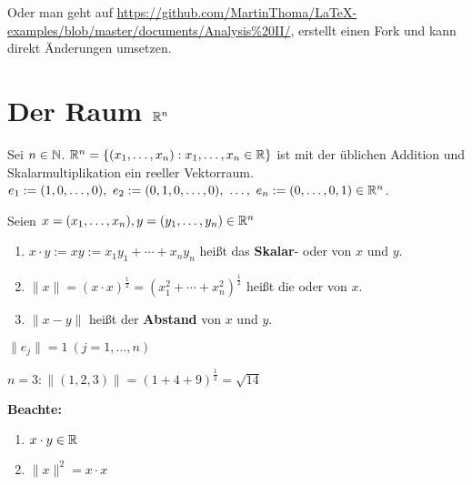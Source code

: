 \documentclass[a4paper,oneside,DIV15,BCOR12mm,chapterprefix=true,headings=onelinechapter]{scrbook}
\begin{document}
Oder man geht auf \url{https://github.com/MartinThoma/LaTeX-examples/blob/master/documents/Analysis%20II/},
erstellt einen Fork und kann direkt Änderungen umsetzen.


\renewcommand{\thechapter}{\arabic{chapter}}
\renewcommand{\chaptername}{§}
\setcounter{chapter}{0}

\chapter{Der Raum $\mathbb{R}^n$}

Sei $n\in\mathbb{N}$. $\mathbb{R}^n=\{(x_1, \ldots, x_n) : x_1,\ldots, x_n \in \mathbb{R}\}$ ist mit der üblichen Addition und Skalarmultiplikation ein reeller Vektorraum.\\
$e_1 := (1,0,\ldots,0),\ e_2:=(0,1,0,\ldots, 0),\ \ldots,\ e_n:=(0,\ldots,0,1) \in \mathbb{R}^n$.

\begin{definition}
Seien $x=(x_1, \ldots, x_n), y=(y_1, \ldots, y_n) \in \mathbb{R}^n$
\begin{enumerate}
\item $x\cdot y := xy := x_1y_1+\cdots+x_ny_n$ heißt das \textbf{Skalar}- oder  von $x$ und $y$.
\item $\|x\|=(x\cdot x)^\frac{1}{2} = (x_1^2 + \cdots + x_n^2)^\frac{1}{2}$ heißt die  oder  von $x$.
\item {}$\|x-y\|$ heißt der \textbf{Abstand} von $x$ und $y$.
\end{enumerate}
\end{definition}

\begin{beispiele}
\item $\|e_j\|=1\ (j=1,\dots,n)$
\item $n=3: \|(1,2,3)\|=(1+4+9)^{\frac{1}{2}}=\sqrt{14}$
\end{beispiele}

\textbf{Beachte: }
\begin{enumerate}
\item $x \cdot y \in \mathbb{R}$
\item $\|x\|^2=x \cdot x$
\end{enumerate}
\end{document}
